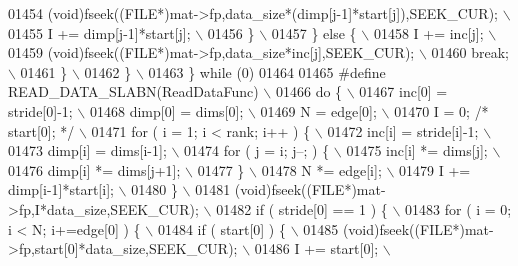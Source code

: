 \begin{DoxyCode}
{{{{{01454 \textcolor{preprocessor}{                    (void)fseek((FILE*)mat->fp,data\_size*(dimp[j-1]*start[j]),SEEK\_CUR); \(\backslash\)}
01455 \textcolor{preprocessor}{                    I += dimp[j-1]*start[j]; \(\backslash\)}
01456 \textcolor{preprocessor}{                \} \(\backslash\)}
01457 \textcolor{preprocessor}{            \} else \{ \(\backslash\)}
01458 \textcolor{preprocessor}{                I += inc[j]; \(\backslash\)}
01459 \textcolor{preprocessor}{                (void)fseek((FILE*)mat->fp,data\_size*inc[j],SEEK\_CUR); \(\backslash\)}
01460 \textcolor{preprocessor}{                break; \(\backslash\)}
01461 \textcolor{preprocessor}{            \} \(\backslash\)}
01462 \textcolor{preprocessor}{        \} \(\backslash\)}
01463 \textcolor{preprocessor}{    \} while (0)}
01464 
01465 \textcolor{preprocessor}{#define READ\_DATA\_SLABN(ReadDataFunc) \(\backslash\)}
01466 \textcolor{preprocessor}{    do \{ \(\backslash\)}
01467 \textcolor{preprocessor}{        inc[0]  = stride[0]-1; \(\backslash\)}
01468 \textcolor{preprocessor}{        dimp[0] = dims[0]; \(\backslash\)}
01469 \textcolor{preprocessor}{        N       = edge[0]; \(\backslash\)}
01470 \textcolor{preprocessor}{        I       = 0; }\textcolor{comment}{/* start[0]; */}\textcolor{preprocessor}{ \(\backslash\)}
01471 \textcolor{preprocessor}{        for ( i = 1; i < rank; i++ ) \{ \(\backslash\)}
01472 \textcolor{preprocessor}{            inc[i]  = stride[i]-1; \(\backslash\)}
01473 \textcolor{preprocessor}{            dimp[i] = dims[i-1]; \(\backslash\)}
01474 \textcolor{preprocessor}{            for ( j = i; j--; ) \{ \(\backslash\)}
01475 \textcolor{preprocessor}{                inc[i]  *= dims[j]; \(\backslash\)}
01476 \textcolor{preprocessor}{                dimp[i] *= dims[j+1]; \(\backslash\)}
01477 \textcolor{preprocessor}{            \} \(\backslash\)}
01478 \textcolor{preprocessor}{            N *= edge[i]; \(\backslash\)}
01479 \textcolor{preprocessor}{            I += dimp[i-1]*start[i]; \(\backslash\)}
01480 \textcolor{preprocessor}{        \} \(\backslash\)}
01481 \textcolor{preprocessor}{        (void)fseek((FILE*)mat->fp,I*data\_size,SEEK\_CUR); \(\backslash\)}
01482 \textcolor{preprocessor}{        if ( stride[0] == 1 ) \{ \(\backslash\)}
01483 \textcolor{preprocessor}{            for ( i = 0; i < N; i+=edge[0] ) \{ \(\backslash\)}
01484 \textcolor{preprocessor}{                if ( start[0] ) \{ \(\backslash\)}
01485 \textcolor{preprocessor}{                    (void)fseek((FILE*)mat->fp,start[0]*data\_size,SEEK\_CUR); \(\backslash\)}
01486 \textcolor{preprocessor}{                    I += start[0]; \(\backslash\)}
}}}}}
\end{DoxyCode}

